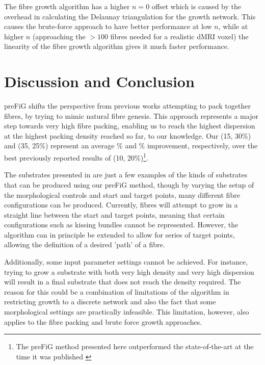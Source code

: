 The fibre growth algorithm has a higher $n=0$ offset which is caused by the overhead in calculating the Delaunay triangulation for the growth network.
This causes the brute-force approach to have better performance at low $n$, while at higher $n$ (approaching the $>100$ fibres needed for a realistic dMRI voxel) the linearity of the fibre growth algorithm gives it much faster performance.



\section{Discussion and Conclusion}
\label{sec:ipmi_discussion}
\ac{preFiG} shifts the perspective from previous works attempting to pack together fibres, by trying to mimic natural fibre genesis.
This approach represents a major step towards very high fibre packing, enabling us to reach the highest dispersion at the highest packing density reached so far, to our knowledge. Our (15\degree, 30\%) and (35\degree, 25\%) represent an average \% and \% improvement, respectively, over the best previously reported results of (10\degree, 20\%)\cite{Ginsburger2018}\footnote{The \ac{preFiG} method presented here outperformed the state-of-the-art at the time it was published \cite{Callaghan2019}}.


The substrates presented in  are just a few examples of the kinds of substrates that can be produced using our \ac{preFiG} method, though by varying the setup of the morphological controls and start and target points, many different fibre configurations can be produced.
Currently, fibres will attempt to grow in a straight line between the start and target points, meaning that certain configurations such as kissing bundles cannot be represented.
However, the algorithm can in principle be extended to allow for series of target points, allowing the definition of a desired 'path' of a fibre.

Additionally, some input parameter settings cannot be achieved.
For instance, trying to grow a substrate with both very high density and very high dispersion will result in a final substrate that does not reach the density required.
The reason for this could be a combination of limitations of the algorithm in restricting growth to a discrete network and also the fact that some morphological settings are practically infeasible.
This limitation, however, also applies to the fibre packing and  brute force growth approaches.

